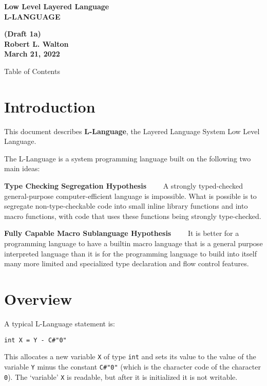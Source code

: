\documentclass[12pt]{article}
\makeatletter
\renewcommand\tableofcontents{%
    \begin{list}{}%
	     {\setlength{\itemsep}{0in}%
	      \setlength{\topsep}{0in}%
	      \setlength{\parsep}{1ex}%
	      \setlength{\labelwidth}{0in}%
	      \setlength{\baselineskip}{1.5ex}%
	      \setlength{\leftmargin}{0.8in}%
	      \setlength{\rightmargin}{0.8in}}%
    \item\@starttoc{toc}%
    \end{list}}
\newcommand{\key}[1]{{\rm \bfseries #1}}
\newenvironment{indpar}[1][0.3in]%
	{\begin{list}{}%
		     {\setlength{\itemsep}{0in}%
		      \setlength{\topsep}{0in}%
		      \setlength{\parsep}{1ex}%
		      \setlength{\labelwidth}{#1}%
		      \setlength{\leftmargin}{#1}%
		      \addtolength{\leftmargin}{\labelsep}}%
	 \item}%
	{\end{list}}
\makeatother
\begin{document}
        
\begin{center}
\Large \bf
Low Level Layered Language\\[0.5ex]
\huge \bf
L-LANGUAGE
\end{center}
\begin{center}
\large \bf
(Draft 1a)
\\[0.5ex]
Robert L. Walton\\
March 21, 2022

\bigskip
 
Table of Contents
\end{center}

\bigskip

\tableofcontents 

\newpage

\section{Introduction}

This document describes \key{L-Language}, the Layered Language
System Low Level Language.

The L-Language is a system programming language built on the
following two main ideas:

\begin{indpar}

\key{Type Checking Segregation Hypothesis}~~~~ A strongly typed-checked
general-purpose computer-efficient language is impossible.
What is possible is
to segregate non-type-checkable code into small inline
library functions and into macro functions,
with code that uses these functions being
strongly type-checked.

\key{Fully Capable Macro Sublanguage Hypothesis}~~~~ It is better for
a programming language to have a builtin macro language that
is a general purpose interpreted language than it is for the
programming language to build into itself
many more limited and specialized type declaration and
flow control features.

\end{indpar}

\section{Overview}

A typical L-Language statement is:
\begin{indpar}\begin{verbatim}
int X = Y - C#"0"
\end{verbatim}\end{indpar}
This allocates a new variable {\tt X} of type {\tt int}
and sets its value to the value of the
variable {\tt Y} minus the constant {\tt C\#"0"} (which is
the character code of the character {\tt 0}).
The `variable' {\tt X} is readable, but after it is
initialized it is not writable.
\end{document}
